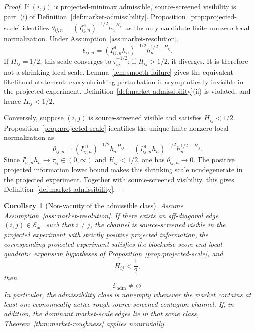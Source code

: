 \documentclass[11pt,a4paper]{amsart}
\theoremstyle{plain}
\newtheorem{corollary}[theorem]{Corollary}
\theoremstyle{definition}
\theoremstyle{remark}
\newcommand{\cE}{\mathcal{E}}
\begin{document}
\begin{proof}
If \((i,j)\) is projected-minimax admissible, source-screened visibility is part~(i) of
Definition~\ref{def:market-admissibility}.  Proposition~\ref{prop:projected-scale} identifies
\(\theta_{ij,n}=(I_{ij,n}^{\mathrm{eff}})^{-1/2}h_n^{-H_{ij}}\) as the only candidate finite nonzero local
normalization.  Under Assumption~\ref{ass:market-resolution},
\[
        \theta_{ij,n}
        =
        (I_{ij,n}^{\mathrm{eff}}h_n)^{-1/2}h_n^{1/2-H_{ij}}.
\]
If \(H_{ij}=1/2\), this scale converges to \(\tau_{ij}^{-1/2}\); if \(H_{ij}>1/2\), it diverges.
It is therefore not a shrinking local scale.  Lemma~\ref{lem:smooth-failure} gives the equivalent
likelihood statement: every shrinking perturbation is asymptotically invisible in the projected
experiment.  Definition~\ref{def:market-admissibility}(ii) is violated, and hence \(H_{ij}<1/2\).

Conversely, suppose \((i,j)\) is source-screened visible and satisfies \(H_{ij}<1/2\).
Proposition~\ref{prop:projected-scale} identifies the unique finite nonzero local
normalization as
\[
        \theta_{ij,n}
        =
        (I_{ij,n}^{\mathrm{eff}})^{-1/2}h_n^{-H_{ij}}
        =
        (I_{ij,n}^{\mathrm{eff}} h_n)^{-1/2}h_n^{1/2-H_{ij}}.
\]
Since \(I_{ij,n}^{\mathrm{eff}} h_n\to\tau_{ij}\in(0,\infty)\) and \(H_{ij}<1/2\), one has
\(\theta_{ij,n}\to0\).  The
positive projected information lower bound makes this shrinking scale nondegenerate in the
projected experiment.  Together with source-screened visibility, this gives
Definition~\ref{def:market-admissibility}.
\end{proof}

\begin{corollary}[Non-vacuity of the admissible class]\label{cor:admissibility-nonvacuous}
Assume Assumption~\ref{ass:market-resolution}.  If there exists an off-diagonal edge
\((i,j)\in\cE_{\mathrm{act}}\) such that \(i\neq j\), the channel is source-screened visible in the
projected experiment with strictly positive projected information, the corresponding projected
experiment satisfies the blockwise score and local quadratic expansion hypotheses of
Proposition~\ref{prop:projected-scale}, and
\[
        H_{ij}<\frac12,
\]
then
\[
        \cE_{\mathrm{adm}}\neq\varnothing.
\]
In particular, the admissibility class is nonempty whenever the market contains at least
one economically active rough source-screened contagion channel.  If, in addition, the dominant
market-scale edges lie in that same class, Theorem~\ref{thm:market-roughness} applies nontrivially.
\end{corollary}
\end{document}
